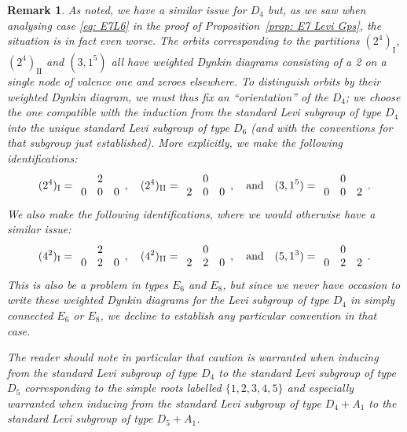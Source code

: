 \documentclass[11pt]{amsart}
\newcommand{\I}{{\mathfrak I}}
\newcommand{\II}{{\operatorname{II}}}
\renewcommand{\I}{{\operatorname{I}}}
\newtheorem{rmk}{Remark}
\numberwithin{equation}{section}
\begin{document}
\begin{rmk}
		As noted, we have a similar issue for $D_4$ but, as we saw when analysing case \eqref{eq: E7L6} in the proof of Proposition~\ref{prop: E7 Levi Gps}, the situation is in fact even worse. The orbits corresponding to the partitions $(2^4)_\I$, $(2^4)_\II$ and $(3,1^5)$ all have weighted Dynkin diagrams consisting of a 2 on a single node of valence one and zeroes elsewhere. To distinguish orbits by their weighted Dynkin diagram, we must thus fix an ``orientation'' of the $D_4$; we choose the one compatible with the induction from the standard Levi subgroup of type $D_4$ into the unique standard Levi subgroup of type $D_6$ (and with the conventions for that subgroup just established). More explicitly, we make the following identifications:
		$$(2^4)_\I = \renewcommand{\arraystretch}{}\begin{array}{c c c}
			& 2 & \\
			0 & 0 & 0    \\
		\end{array}, \quad (2^4)_\II = \renewcommand{\arraystretch}{}\begin{array}{c c c}
			& 0 & \\
			2 & 0 & 0    \\
		\end{array}, \quad\mbox{and}\quad (3,1^5) =  \renewcommand{\arraystretch}{}\begin{array}{c c c}
			& 0 & \\
			0 & 0 & 2    \\
		\end{array}.$$ We also make the following identifications, where we would otherwise have a similar issue:
		$$(4^2)_\I = \renewcommand{\arraystretch}{}\begin{array}{c c c}
			& 2 & \\
			0 & 2 & 0    \\
		\end{array}, \quad (4^2)_\II = \renewcommand{\arraystretch}{}\begin{array}{c c c}
			& 0 & \\
			2 & 2 & 0    \\
		\end{array}, \quad\mbox{and}\quad (5,1^3)= \renewcommand{\arraystretch}{}\begin{array}{c c c}
			& 0 & \\
			0 & 2 & 2    \\
		\end{array}.$$
		This is also be a problem in types $E_6$ and $E_8$, but since we never have occasion to write these weighted Dynkin diagrams for the Levi subgroup of type $D_4$ in simply connected $E_6$ or $E_8$, we decline to establish any particular convention in that case.
		
		The reader should note in particular that caution is warranted when inducing from the standard Levi subgroup of type $D_4$ to the standard Levi subgroup of type $D_5$ corresponding to the simple roots labelled $\{1,2,3,4,5\}$ and especially warranted when inducing from the standard Levi subgroup of type $D_4+A_1$ to the standard Levi subgroup of type $D_5+A_1$.
		
		
	\end{rmk}
\end{document}
